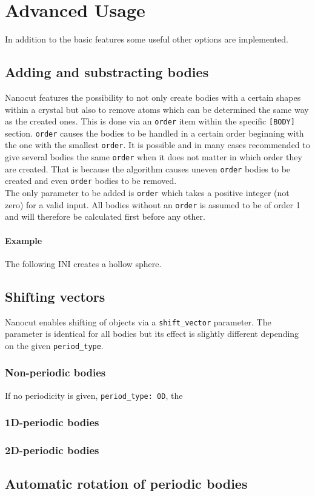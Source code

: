 \section{Advanced Usage}
In addition to the basic features some useful other options are implemented. 
\subsection{Adding and substracting bodies}
Nanocut features the possibility to not only create bodies with a certain shapes within a crystal but also to remove atoms which can be determined the same way as the created ones. This is done via an \lstinline{order} item within the specific \lstinline{[BODY]} section. \lstinline{order} causes the bodies to be handled in a certain order beginning with the one with the smallest \lstinline{order}. It is possible and in many cases recommended to give several bodies the same \lstinline{order} when it does not matter in which order they are created. That is because the algorithm causes uneven \lstinline{order} bodies to be created and even \lstinline{order} bodies to be removed.\\
The only parameter to be added is \lstinline{order} which takes a positive integer (not zero) for a valid input. All bodies without an \lstinline{order} is assumed to be of order 1 and will therefore be calculated first before any other.
\paragraph{Example}
The following INI creates a hollow sphere.

\subsection{Shifting vectors}
Nanocut enables shifting of objects via a \lstinline{shift_vector} parameter. The parameter is identical for all bodies but its effect is slightly different depending on the given \lstinline{period_type}.
\subsubsection{Non-periodic bodies}
If no periodicity is given, \lstinline{period_type: 0D}, the 
\subsubsection{1D-periodic bodies}
\subsubsection{2D-periodic bodies}
\subsection{Automatic rotation of periodic bodies}
